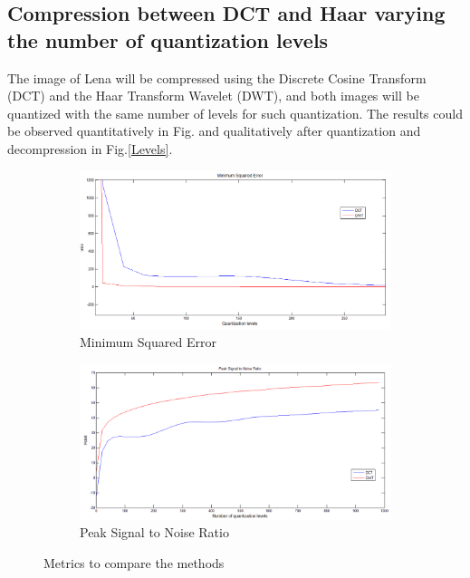 \documentclass[a4paper, 10pt, conference] {article}
\begin{document}
 \subsection{Compression between DCT and Haar varying the number of quantization levels}
 The image of Lena will be compressed using the Discrete Cosine Transform (DCT) and the Haar Transform Wavelet (DWT), and both images will be quantized with the same number of levels for such quantization. The results could be observed quantitatively in Fig. and qualitatively after quantization and decompression in Fig.\ref{Levels}. 
 \begin{figure}[H]
 	\centering
 	\begin{subfigure}{0.49\textwidth} 
 		\centering						
 		\includegraphics[scale=0.3]{reportImages/MSE.PNG}
 		\caption{Minimum Squared Error}
 	\end{subfigure}
 	\begin{subfigure}{0.49\textwidth}
 		\centering
 		\includegraphics[scale=0.3]{reportImages/PSNR.PNG}
 		\caption{Peak Signal to Noise Ratio}
 	\end{subfigure}
	\caption{Metrics to compare the methods }
 	\label{Metrics1}
 \end{figure}
 
\end{document}
